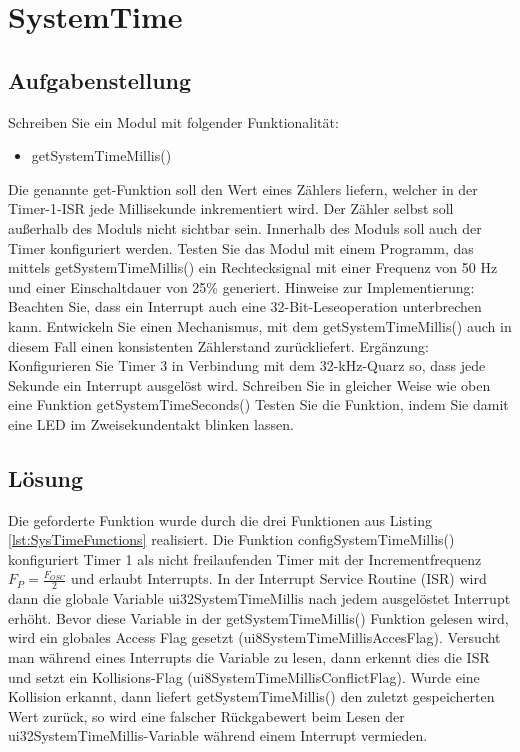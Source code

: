 \section{SystemTime}
\subsection{Aufgabenstellung}

Schreiben Sie ein Modul mit folgender Funktionalität:
\begin{itemize}
	\item getSystemTimeMillis()
\end{itemize}
Die genannte get-Funktion soll den Wert eines Zählers liefern, welcher in der Timer-1-ISR jede Millisekunde inkrementiert wird. Der Zähler selbst soll außerhalb des Moduls nicht sichtbar sein.
Innerhalb des Moduls soll auch der Timer konfiguriert werden.\newline
Testen Sie das Modul mit einem Programm, das mittels getSystemTimeMillis() ein Rechtecksignal mit einer Frequenz von 50 Hz und einer Einschaltdauer von 25\% generiert.\newline\newline
Hinweise zur Implementierung:\newline
Beachten Sie, dass ein Interrupt auch eine 32-Bit-Leseoperation unterbrechen kann. Entwickeln Sie einen Mechanismus, mit dem  getSystemTimeMillis() auch in diesem Fall einen konsistenten Zählerstand zurückliefert.\newline\newline
{\footnotesize Ergänzung:\newline
Konfigurieren Sie Timer 3 in Verbindung mit dem 32-kHz-Quarz so, dass jede Sekunde ein Interrupt ausgelöst wird. Schreiben Sie in gleicher Weise wie oben eine Funktion getSystemTimeSeconds()
Testen Sie die Funktion, indem Sie damit eine LED im Zweisekundentakt blinken lassen.
}
\subsection{Lösung}
Die geforderte Funktion wurde durch die drei Funktionen aus Listing \ref{lst:SysTimeFunctions} realisiert. Die Funktion configSystemTimeMillis() konfiguriert Timer 1 als nicht freilaufenden Timer mit der Incrementfrequenz $ F_P=\frac{F_{OSC}}{2} $ und erlaubt Interrupts.\newline
In der Interrupt Service Routine (ISR) wird dann die globale Variable ui32SystemTimeMillis nach jedem ausgelöstet Interrupt erhöht.\newline
Bevor diese Variable in der getSystemTimeMillis() Funktion gelesen wird, wird ein globales Access Flag gesetzt (ui8SystemTimeMillisAccesFlag). Versucht man während eines Interrupts die Variable zu lesen, dann erkennt dies die ISR und setzt ein Kollisions-Flag (ui8SystemTimeMillisConflictFlag). Wurde eine Kollision erkannt, dann liefert getSystemTimeMillis() den zuletzt gespeicherten Wert zurück, so wird eine falscher Rückgabewert beim Lesen der ui32SystemTimeMillis-Variable während einem Interrupt vermieden.



